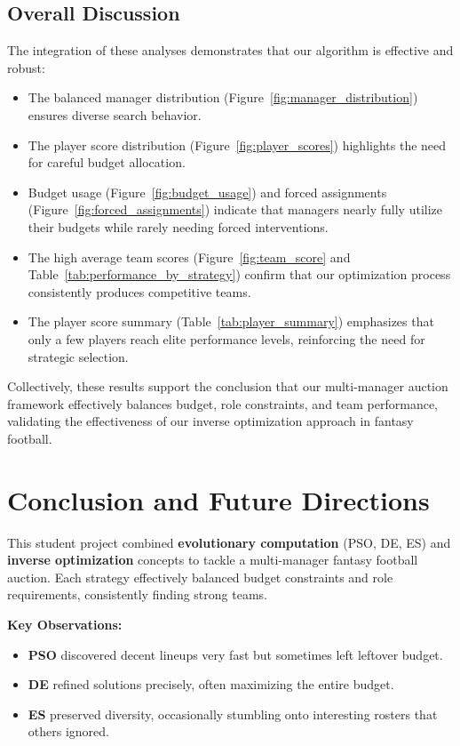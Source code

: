 \documentclass[sigconf]{acmart}
\begin{document}
\subsection{Overall Discussion}
The integration of these analyses demonstrates that our algorithm is effective and robust:
\begin{itemize}
	\item The balanced manager distribution (Figure~\ref{fig:manager_distribution}) ensures diverse search behavior.
	\item The player score distribution (Figure~\ref{fig:player_scores}) highlights the need for careful budget allocation.
	\item Budget usage (Figure~\ref{fig:budget_usage}) and forced assignments (Figure~\ref{fig:forced_assignments}) indicate that managers nearly fully utilize their budgets while rarely needing forced interventions.
	\item The high average team scores (Figure~\ref{fig:team_score} and Table~\ref{tab:performance_by_strategy}) confirm that our optimization process consistently produces competitive teams.
	\item The player score summary (Table~\ref{tab:player_summary}) emphasizes that only a few players reach elite performance levels, reinforcing the need for strategic selection.
\end{itemize}

Collectively, these results support the conclusion that our multi-manager auction framework effectively balances budget, role constraints, and team performance, validating the effectiveness of our inverse optimization approach in fantasy football.


\section{Conclusion and Future Directions}
\label{sec:conclusion}
This student project combined \textbf{evolutionary computation} (PSO, DE, ES) and \textbf{inverse optimization} concepts to tackle a multi-manager fantasy football auction. Each strategy effectively balanced budget constraints and role requirements, consistently finding strong teams.

\textbf{Key Observations:}
\begin{itemize}
	\item \textbf{PSO} discovered decent lineups very fast but sometimes left leftover budget.
	\item \textbf{DE} refined solutions precisely, often maximizing the entire budget.
	\item \textbf{ES} preserved diversity, occasionally stumbling onto interesting rosters that others ignored.
\end{itemize}
\end{document}
